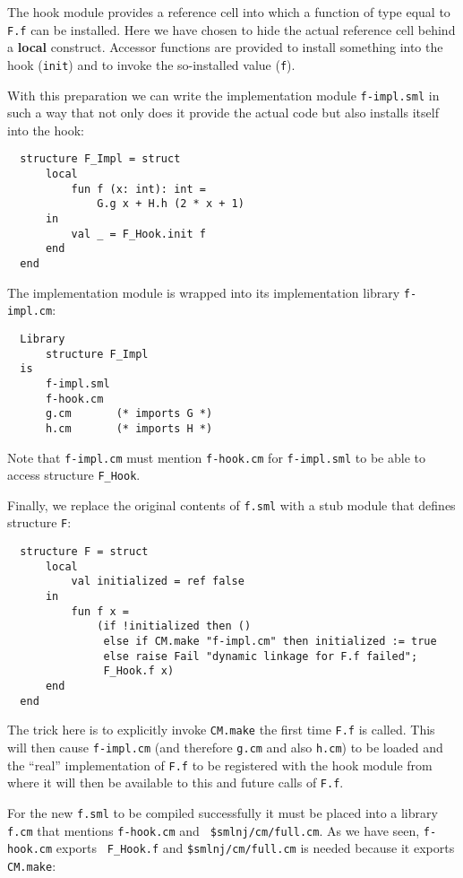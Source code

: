 \documentclass[titlepage,letterpaper]{article}
\begin{document}
The hook module provides a reference cell into which a function of
type equal to {\tt F.f} can be installed.  Here we have chosen to hide
the actual reference cell behind a {\bf local} construct.  Accessor
functions are provided to install something into the hook
({\tt init}) and to invoke the so-installed value ({\tt f}).

With this preparation we can write the implementation module {\tt f-impl.sml}
in such a way that not only does it provide the actual
code but also installs itself into the hook:
\begin{verbatim}
  structure F_Impl = struct
      local
          fun f (x: int): int =
              G.g x + H.h (2 * x + 1)
      in
          val _ = F_Hook.init f
      end
  end
\end{verbatim}
\noindent The implementation module is wrapped into its implementation
library {\tt f-impl.cm}:
\begin{verbatim}
  Library
      structure F_Impl
  is
      f-impl.sml
      f-hook.cm
      g.cm       (* imports G *)
      h.cm       (* imports H *)
\end{verbatim}
\noindent Note that {\tt f-impl.cm} must mention {\tt f-hook.cm} for
{\tt f-impl.sml} to be able to access structure {\tt F\_Hook}.

Finally, we replace the original contents of {\tt f.sml} with a stub
module that defines structure {\tt F}:
\begin{verbatim}
  structure F = struct
      local
          val initialized = ref false
      in
          fun f x =
              (if !initialized then ()
               else if CM.make "f-impl.cm" then initialized := true
               else raise Fail "dynamic linkage for F.f failed";
               F_Hook.f x)
      end
  end
\end{verbatim}
\noindent The trick here is to explicitly invoke {\tt CM.make} the
first time {\tt F.f} is called.  This will then cause {\tt f-impl.cm}
(and therefore {\tt g.cm} and also {\tt h.cm}) to be loaded and the
``real'' implementation of {\tt F.f} to be registered with the hook
module from where it will then be available to this and future calls
of {\tt F.f}.

For the new {\tt f.sml} to be compiled successfully it must be placed
into a library {\tt f.cm} that mentions {\tt f-hook.cm} and {\tt
\$smlnj/cm/full.cm}.  As we have seen, {\tt f-hook.cm} exports {\tt
F\_Hook.f} and {\tt \$smlnj/cm/full.cm} is needed because it exports
{\tt CM.make}:
\end{document}
